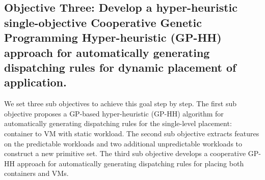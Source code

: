 \begin{enumerate}

	

	\end{enumerate}




\subsection{Objective Three: Develop a hyper-heuristic single-objective Cooperative Genetic Programming Hyper-heuristic (GP-HH) approach for automatically generating dispatching rules for dynamic placement of application.}

 We set three sub objectives to achieve this goal step by step. The first sub objective proposes a GP-based hyper-heuristic (GP-HH) algorithm for automatically generating dispatching rules for the single-level placement: container to VM with static workload. The second sub objective extracts features on the predictable workloads and two additional unpredictable workloads to construct a new primitive set. The third sub objective develops a cooperative GP-HH approach for automatically generating dispatching rules for placing both containers and VMs.



